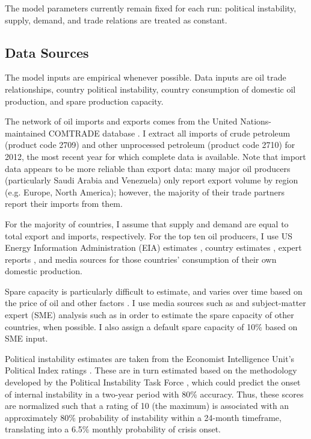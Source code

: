 \documentclass{article}
\begin{document}
The model parameters currently remain fixed for each run: political instability, supply, demand, and trade relations are treated as constant. 

\subsection{Data Sources}
The model inputs are empirical whenever possible. Data inputs are oil trade relationships, country political instability,  country consumption of domestic oil production, and spare production capacity.

The network of oil imports and exports comes from the United Nations-maintained COMTRADE database \citep{un_2013}. I extract all imports of crude petroleum (product code 2709) and other unprocessed petroleum (product code 2710) for 2012, the most recent year for which complete data is available. Note that import data appears to be more reliable than export data: many major oil producers (particularly Saudi Arabia and Venezuela) only report export volume by region (e.g. Europe, North America); however, the majority of their trade partners report their imports from them.

For the majority of countries, I assume that supply and demand are equal to total export and imports, respectively. For the top ten oil producers, I use US Energy Information Administration (EIA) estimates \citep{eia_2013}, country estimates \citep{canada_2009,eia_domestic}, expert reports \citep{mohamedi_2010}, and media sources \citep{rasmi_2013} for those countries' consumption of their own domestic production. 

Spare capacity is particularly difficult to estimate, and varies over time based on the price of oil and other factors \citep{mearns_2012}. I use media sources such as \citet{daya_2012} and subject-matter expert (SME) analysis such as \citet{mearns_2012} in order to estimate the spare capacity of other countries, when possible. I also assign a default spare capacity of 10\% based on SME input.

Political instability estimates are taken from the Economist Intelligence Unit's Political Index ratings \citep{eiu_2013}. These are in turn estimated based on the methodology developed by the Political Instability Task Force \citep{goldstone_2005}, which could predict the onset of internal instability in a two-year period with 80\% accuracy. Thus, these scores are normalized such that a rating of 10 (the maximum) is associated with an approximately 80\% probability of instability within a 24-month timeframe, translating into a 6.5\% monthly probability of crisis onset.
\end{document}
